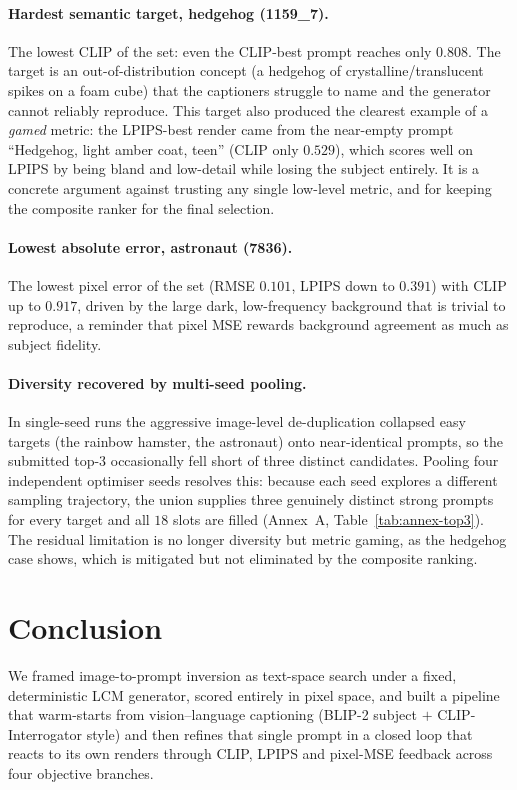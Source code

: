 \documentclass[runningheads]{llncs}
\begin{document}
\paragraph{\normalfont\textbf{Hardest semantic target, hedgehog (1159\_7).}} The lowest CLIP of the set: even the CLIP-best prompt reaches only $0.808$. The target is an out-of-distribution concept (a hedgehog of crystalline/translucent spikes on a foam cube) that the captioners struggle to name and the generator cannot reliably reproduce. This target also produced the clearest example of a \emph{gamed} metric: the LPIPS-best render came from the near-empty prompt ``Hedgehog, light amber coat, teen'' (CLIP only $0.529$), which scores well on LPIPS by being bland and low-detail while losing the subject entirely. It is a concrete argument against trusting any single low-level metric, and for keeping the composite ranker for the final selection.

\paragraph{\normalfont\textbf{Lowest absolute error, astronaut (7836).}} The lowest pixel error of the set (RMSE $0.101$, LPIPS down to $0.391$) with CLIP up to $0.917$, driven by the large dark, low-frequency background that is trivial to reproduce, a reminder that pixel MSE rewards background agreement as much as subject fidelity.

\paragraph{\normalfont\textbf{Diversity recovered by multi-seed pooling.}} In single-seed runs the aggressive image-level de-duplication collapsed easy targets (the rainbow hamster, the astronaut) onto near-identical prompts, so the submitted top-3 occasionally fell short of three distinct candidates. Pooling four independent optimiser seeds resolves this: because each seed explores a different sampling trajectory, the union supplies three genuinely distinct strong prompts for every target and all $18$ slots are filled (Annex~A, Table~\ref{tab:annex-top3}). The residual limitation is no longer diversity but metric gaming, as the hedgehog case shows, which is mitigated but not eliminated by the composite ranking.

\section{Conclusion}
We framed image-to-prompt inversion as text-space search under a fixed, deterministic LCM generator, scored entirely in pixel space, and built a pipeline that warm-starts from vision–language captioning (BLIP-2 subject $+$ CLIP-Interrogator style) and then refines that single prompt in a closed loop that reacts to its own renders through CLIP, LPIPS and pixel-MSE feedback across four objective branches.
\end{document}
